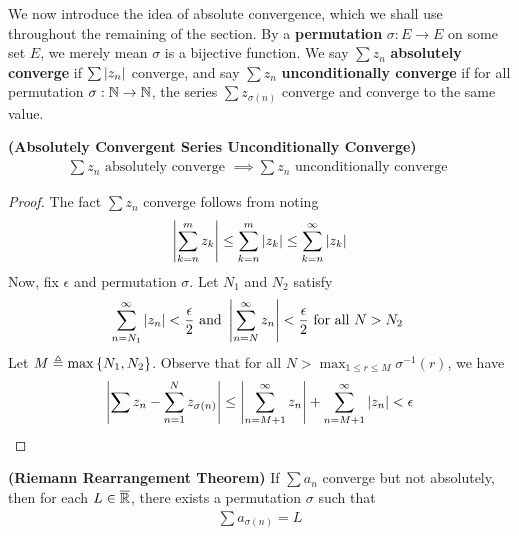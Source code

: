 \documentclass{report}
\begin{document}
\begin{mdframed}
We now introduce the idea of absolute convergence, which we shall use throughout the remaining of the section. By a \textbf{permutation} $\sigma:E\rightarrow E$ on some set $E$, we merely mean  $\sigma$ is a bijective function. We say $\sum z_n$ \textbf{absolutely converge} if $\sum \left|z_n\right|$ converge, and say $\sum z_n$ \textbf{unconditionally converge} if for all permutation $\sigma:\mathbb{N}\rightarrow \mathbb{N}$, the series $\sum z_{\sigma (n)}$ converge and converge to the same value.
\end{mdframed}
\begin{theorem}
\label{ACSUC}
\textbf{(Absolutely Convergent Series Unconditionally Converge)} 
\begin{align*}
\sum z_n\text{ absolutely converge }\implies \sum z_n\text{ unconditionally converge }
\end{align*}
\end{theorem}
\begin{proof}
The fact $\sum z_n$ converge  follows from noting 
\begin{align*}
  \left|\sum_{k=n}^mz_k\right|\leq \sum_{k=n}^m \left|z_k\right|\leq \sum_{k=n}^{\infty} \left|z_k\right|
\end{align*}
Now, fix $\epsilon $ and permutation $\sigma$. Let $N_1$ and $N_2$ satisfy 
\begin{align*}   
\sum_{n=N_1}^{\infty}\left|z_n\right|<\frac{\epsilon}{2}\text{ and }\left|\sum_{n=N}^{\infty}z_n\right|<\frac{\epsilon}{2}\text{ for all $N>N_2$ }
\end{align*}
Let $M\triangleq \max \left\{ N_1,N_2 \right\}$. Observe that for all  $N> \max_{1\leq r\leq M} \sigma^{-1}(r)$, we have 
\begin{align*}
\left|\sum z_n - \sum_{n=1}^N z_{\sigma (n)}\right|\leq \left|\sum_{n=M+1}^{\infty} z_n \right|+ \sum_{n=M+1}^{\infty} \left|z_n\right|<\epsilon 
\end{align*}
\end{proof}
\begin{theorem}
\label{RRT}
\textbf{(Riemann Rearrangement Theorem)} If $\sum a_n$ converge but not absolutely, then for each $L\in\overline{\mathbb{R}}$, there exists a permutation $\sigma$ such that 
\begin{align*}
\sum a_{\sigma (n)}=L
\end{align*}
\end{theorem}
\end{document}
